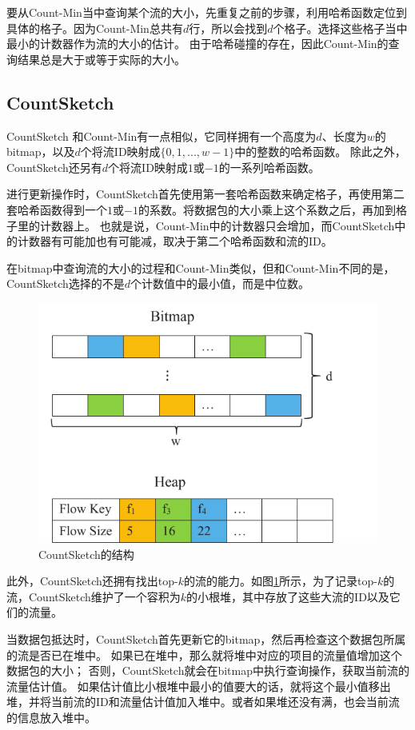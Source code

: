 要从Count-Min当中查询某个流的大小，先重复之前的步骤，利用哈希函数定位到具体的格子。因为Count-Min总共有$d$行，所以会找到$d$个格子。选择这些格子当中最小的计数器作为流的大小的估计。
由于哈希碰撞的存在，因此Count-Min的查询结果总是大于或等于实际的大小。

\subsection{CountSketch \cite{charikar2004finding}}\label{sec:countsketch}
CountSketch \cite{charikar2004finding}和Count-Min有一点相似，它同样拥有一个高度为$d$、长度为$w$的bitmap，以及$d$个将流ID映射成$\{0,1,...,w-1\}$中的整数的哈希函数。
除此之外，CountSketch还另有$d$个将流ID映射成$1$或$-1$的一系列哈希函数。

进行更新操作时，CountSketch首先使用第一套哈希函数来确定格子，再使用第二套哈希函数得到一个$1$或$-1$的系数。将数据包的大小乘上这个系数之后，再加到格子里的计数器上。
也就是说，Count-Min中的计数器只会增加，而CountSketch中的计数器有可能加也有可能减，取决于第二个哈希函数和流的ID。

在bitmap中查询流的大小的过程和Count-Min类似，但和Count-Min不同的是，CountSketch选择的不是$d$个计数值中的最小值，而是中位数。

\begin{figure}
   \centering
   \includegraphics[width=0.7\linewidth]{fig/countsketch.pdf}
   \caption{CountSketch的结构}
   \label{fig:countsketch}
\end{figure}

此外，CountSketch还拥有找出top-$k$的流的能力。如图\ref{fig:countsketch}所示，为了记录top-$k$的流，CountSketch维护了一个容积为$k$的小根堆，其中存放了这些大流的ID以及它们的流量。

当数据包抵达时，CountSketch首先更新它的bitmap，然后再检查这个数据包所属的流是否已在堆中。
如果已在堆中，那么就将堆中对应的项目的流量值增加这个数据包的大小；
否则，CountSketch就会在bitmap中执行查询操作，获取当前流的流量估计值。
如果估计值比小根堆中最小的值要大的话，就将这个最小值移出堆，并将当前流的ID和流量估计值加入堆中。或者如果堆还没有满，也会当前流的信息放入堆中。

